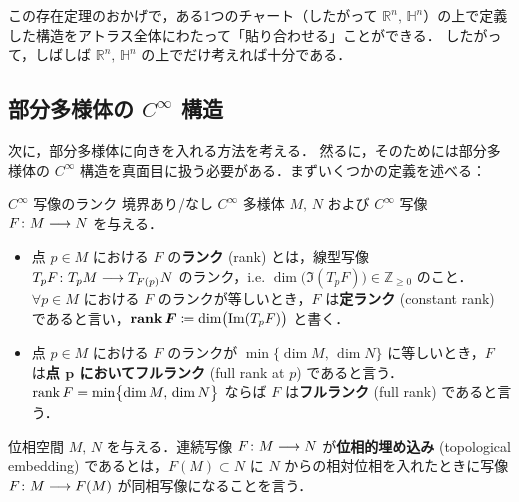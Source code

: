\documentclass[geometry_main]{subfiles}
\begin{document}
この存在定理のおかげで，ある1つのチャート（したがって $\mathbb{R}^n,\, \mathbb{H}^n$）の上で定義した構造をアトラス全体にわたって「貼り合わせる」ことができる．
したがって，しばしば $\mathbb{R}^n,\, \mathbb{H}^n$ の上でだけ考えれば十分である．


\subsection{部分多様体の $C^\infty$ 構造}

次に，部分多様体に向きを入れる方法を考える．
然るに，そのためには部分多様体の $C^\infty$ 構造を真面目に扱う必要がある．まずいくつかの定義を述べる：

\begin{mydef}[label=def:rank-smooth]{$C^\infty$ 写像のランク}
    境界あり/なし $C^\infty$ 多様体 $M,\, N$ および $C^\infty$ 写像 $F \colon M \longrightarrow N$ を与える．
    \begin{itemize}
        \item 点 $p \in M$ における $F$ の\textbf{ランク} (rank) とは，線型写像 $T_p F \colon T_p M \longrightarrow T_{F(p)} N$ のランク，i.e. $\dim \bigl(\Im (T_p F)\bigr) \in \mathbb{Z}_{\ge 0}$ のこと．$\forall p \in M$ における $F$ のランクが等しいとき，$F$ は\textbf{定ランク} (constant rank) であると言い，$\bm{\rank F} \coloneqq \dim \bigl(\Im (T_p F)\bigr)$ と書く．
        \item 点 $p \in M$ における $F$ のランクが $\min \bigl\{\dim M,\, \dim N\bigr\}$ に等しいとき，$F$ は\textbf{点 $\bm{p}$ においてフルランク} (full rank at $p$) であると言う．
        $\rank F = \min \bigl\{\dim M,\, \dim N\bigr\}$ ならば $F$ は\textbf{フルランク} (full rank) であると言う．
    \end{itemize}
\end{mydef}

位相空間 $M,\, N$ を与える．連続写像 $F \colon M \longrightarrow N$ が\textbf{位相的埋め込み} (topological embedding) であるとは，$F(M) \subset N$ に $N$ からの相対位相を入れたときに写像 $F \colon M \longrightarrow F(M)$ が同相写像になることを言う．
\end{document}
